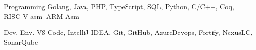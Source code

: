 

\begin{cvskills}

	\cvskill
	{Programming} %
	{Golang, Java, PHP, TypeScript, SQL, Python, C/C++, Coq, RISC-V asm, ARM Asm} %

	\cvskill
	{Dev. Env.} %
	{VS Code, IntelliJ IDEA, Git, GitHub, AzureDevops, Fortify, NexusLC, SonarQube} %

\end{cvskills}
